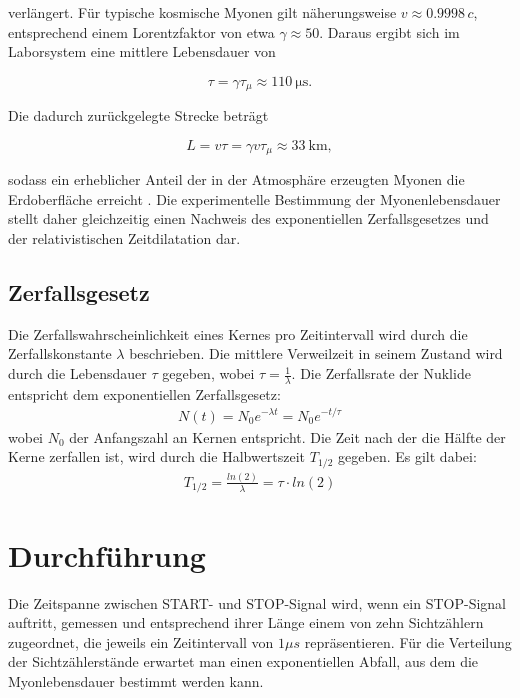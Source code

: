 verlängert. Für typische kosmische Myonen gilt näherungsweise $v\approx0.9998\,c$, entsprechend einem Lorentzfaktor von etwa $\gamma\approx50$. Daraus ergibt sich im Laborsystem eine mittlere Lebensdauer von

\begin{equation}
    \tau = \gamma\tau_\mu
          \approx
          \SI{110}{\micro\second}.
\end{equation}

Die dadurch zurückgelegte Strecke beträgt

\begin{equation}
    L = v\tau
      = \gamma v\tau_\mu
      \approx
      \SI{33}{\kilo\meter},
\end{equation}

sodass ein erheblicher Anteil der in der Atmosphäre erzeugten Myonen die Erdoberfläche erreicht \cite{exphys1_szintillation}. Die experimentelle Bestimmung der Myonenlebensdauer stellt daher gleichzeitig einen Nachweis des exponentiellen Zerfallsgesetzes und der relativistischen Zeitdilatation dar.

\subsection{Zerfallsgesetz}
Die Zerfallswahrscheinlichkeit eines Kernes pro Zeitintervall wird durch die Zerfallskonstante $\lambda$ beschrieben. Die mittlere Verweilzeit in seinem Zustand wird durch die Lebensdauer $\tau$ gegeben, wobei $\tau=\frac{1}{\lambda}$.
Die Zerfallsrate der Nuklide entspricht dem exponentiellen Zerfallsgesetz:\cite{demtroeder}
\begin{align*}
    N(t)=N_0e^{-\lambda t}=N_0e^{-t/\tau}
\end{align*}
wobei $N_0$ der Anfangszahl an Kernen entspricht.
Die Zeit nach der die Hälfte der Kerne zerfallen ist, wird durch die Halbwertszeit $T_{1/2}$ gegeben. Es gilt dabei:
\begin{align*}
    T_{1/2}=\frac{ln(2)}{\lambda}=\tau\cdot ln(2)
\end{align*}
\section{Durchführung}
Die Zeitspanne zwischen START- und STOP-Signal wird, wenn ein STOP-Signal auftritt, gemessen und entsprechend ihrer Länge einem von zehn Sichtzählern zugeordnet, die jeweils ein Zeitintervall von $1\mu s$ repräsentieren. Für die Verteilung der Sichtzählerstände erwartet man einen exponentiellen Abfall, aus dem die Myonlebensdauer bestimmt werden kann.

